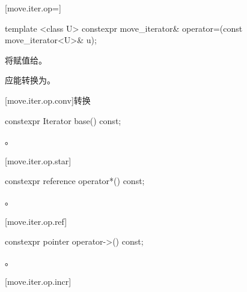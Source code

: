 [move.iter.op=]{}

%
%
\begin{itemdecl}
template <class U> constexpr move_iterator& operator=(const move_iterator<U>& u);
\end{itemdecl}

\begin{itemdescr}
\pnum
\effects 将赋值给。

\pnum
\requires {}应能转换为。
\end{itemdescr}

[move.iter.op.conv]{转换}

%
%
\begin{itemdecl}
constexpr Iterator base() const;
\end{itemdecl}

\begin{itemdescr}
\pnum
\returns {}。
\end{itemdescr}

[move.iter.op.star]{}

%
%
\begin{itemdecl}
constexpr reference operator*() const;
\end{itemdecl}

\begin{itemdescr}
\pnum
\returns {}。
\end{itemdescr}

[move.iter.op.ref]{}

%
%
\begin{itemdecl}
constexpr pointer operator->() const;
\end{itemdecl}

\begin{itemdescr}
\pnum
\returns {}。
\end{itemdescr}

[move.iter.op.incr]{}


